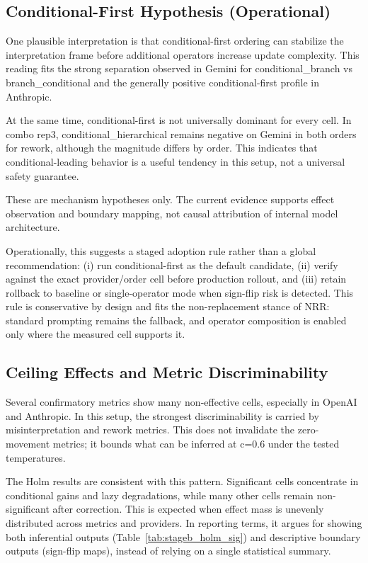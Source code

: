 \documentclass[11pt,a4paper]{article}
\begin{document}
\subsection{Conditional-First Hypothesis (Operational)}

One plausible interpretation is that conditional-first ordering can stabilize the interpretation frame before additional operators increase update complexity. This reading fits the strong separation observed in Gemini for conditional\_branch vs branch\_conditional and the generally positive conditional-first profile in Anthropic.

At the same time, conditional-first is not universally dominant for every cell. In combo rep3, conditional\_hierarchical remains negative on Gemini in both orders for rework, although the magnitude differs by order. This indicates that conditional-leading behavior is a useful tendency in this setup, not a universal safety guarantee.

These are mechanism hypotheses only. The current evidence supports effect observation and boundary mapping, not causal attribution of internal model architecture.

Operationally, this suggests a staged adoption rule rather than a global recommendation: (i) run conditional-first as the default candidate, (ii) verify against the exact provider/order cell before production rollout, and (iii) retain rollback to baseline or single-operator mode when sign-flip risk is detected. This rule is conservative by design and fits the non-replacement stance of NRR: standard prompting remains the fallback, and operator composition is enabled only where the measured cell supports it.

\subsection{Ceiling Effects and Metric Discriminability}

Several confirmatory metrics show many non-effective cells, especially in OpenAI and Anthropic. In this setup, the strongest discriminability is carried by misinterpretation and rework metrics. This does not invalidate the zero-movement metrics; it bounds what can be inferred at c=0.6 under the tested temperatures.

The Holm results are consistent with this pattern. Significant cells concentrate in conditional gains and lazy degradations, while many other cells remain non-significant after correction. This is expected when effect mass is unevenly distributed across metrics and providers. In reporting terms, it argues for showing both inferential outputs (Table~\ref{tab:stageb_holm_sig}) and descriptive boundary outputs (sign-flip maps), instead of relying on a single statistical summary.
\end{document}
